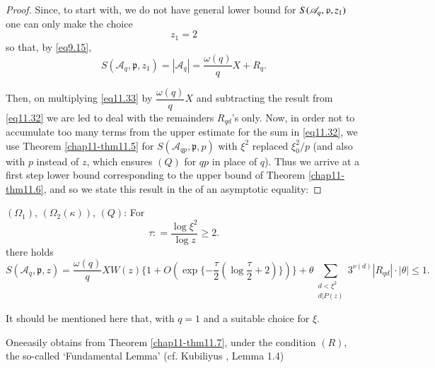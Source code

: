 \begin{proof}
Since, to start with, we do not have general lower bound for  $S
(\mathscr{A}_q,\break \mathfrak{p}, z_1)$  one can only make the choice   
\begin{equation*}
z_1 = 2 \tag{11.38}\label{eq11.38}
\end{equation*}
so that, by \eqref{eq9.15},
\begin{equation*}
S (\mathscr{A}_q, \mathfrak{p}, z_1) = |\mathscr{A}_q| =
\frac{\omega(q)} {q} X + R_q.\tag{11.39}\label{eq11.39} 
\end{equation*}

Then, on multiplying \eqref{eq11.33} by $\dfrac{\omega(q)}{q}X$ and
subtracting the result from \eqref{eq11.32} we are led to deal with the
remainders $R_{qd}$'s only. Now, in order not to accumulate too many
terms from the upper estimate for the sum in \eqref{eq11.32}, we use Theorem
\ref{chap11-thm11.5} for  $S (\mathscr{A}_{qp}, \mathfrak{p},p )$ with $\xi^2$
replaced $\xi_0^2 / p$  (and also with $p$ instead of $z$, which
ensures $(Q)$ for $qp$ in place of $q$). Thus we arrive at a first
step lower bound corresponding to the upper bound of Theorem
\ref{chap11-thm11.6}, and so we state this result in the of an
asymptotic equality:  
\end{proof}

\begin{theorem}\label{chap11-thm11.7}%
$(\Omega_1)$, $(\Omega_2(\kappa))$, $(Q)$:  For
\begin{equation*}
\tau : = \frac{\log \xi^2} {\log z} \ge 2.\tag{11.40}\label{eq11.40} 
\end{equation*}
there holds
{\fontsize{10pt}{12pt}\selectfont
\begin{equation*}
 S (\mathscr{A}_q, \mathfrak{p}, z ) = \frac{\omega(q)} {q} X W(z)
 \{ 1+ O (\exp \{-\frac{\tau} {2} (\log \frac{\tau} {2} +2)\})\}
 + \theta \sum_{\substack{d<\xi^2\\ d|P(z)}} 3^{\nu(d)} |R_{qd}| \cdot
 |\theta|\le  1. \tag{11.41}\label{eq11.41}  
\end{equation*}}\relax 
\end{theorem}

It should be mentioned here that, with $q = 1$ and a suitable choice
for $\xi$. 

One\pageoriginale easily obtains from Theorem \ref{chap11-thm11.7}, under the
condition $(R)$, the 
so-called `Fundamental Lemma' (cf. Kubiliyus \cite{key2}, Lemma 1.4) 

